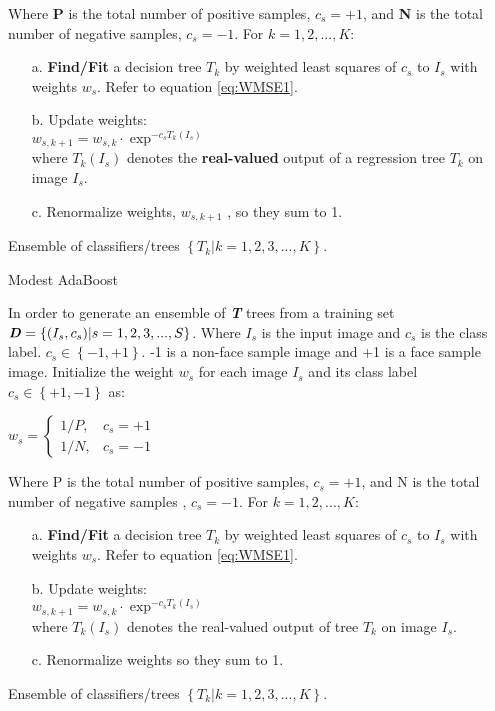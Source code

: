 \begin{compactitem}
\begin{algorithm}[htb]
\begin{algorithmic}[1]
		Where \textbf{P} is the total number of positive samples, $c_s=+1$, and \textbf{N} is the total number
		of negative samples, $c_s=-1$.
    \State For $k = 1,2,...,K:$
    \begin{itemize}
	\item[a.]{\textbf{Find/Fit} a decision tree $T_k$ by weighted least squares of $c_s$ to $I_s$ with
	weights $w_s$}. Refer to equation \eqref{eq:WMSE1}.
	\item[b.]{Update weights:}\\
		$w_{s,k+1} = w_{s,k} \cdot \exp^{-c_s T_k(I_s)}$\\
		where $T_k(I_s)$ denotes the \textbf{real-valued} output of a regression tree $T_k$ on image $I_s$.
	\item[c.]{Renormalize weights, $w_{s,k+1}$ , so they sum to 1.}
	\end{itemize}
    \Ensure
      Ensemble of classifiers/trees $\left\{ { T_k | k=1,2,3,...,K}\right\}$.
  \end{algorithmic}
\end{algorithm}

\begin{algorithm}[htb]
  \caption{ Modest AdaBoost}\cite{GML327}
  \label{alg:ModestAdaBoost}
  \begin{algorithmic}[1]
    \Require
	In order to generate an ensemble of \textbf{\textit{T}} trees from a training set
	$\textbf{\textit{D}}=\left\{ { (I_s,c_s) | s=1,2,3,...,S}\right\}$. Where $I_s$ is
	the input image and $c_s$ is the class label. $c_s \in \left\{{-1,+1 } \right\}$.
	-1 is a non-face sample image and +1 is a face sample image.
    \State Initialize the weight $w_s$ for each image $I_s$ and its class label $c_s \in
    	\left\{ {+1,-1}\right\}$ as:

    $w_s=
	\begin{cases}
    1/P,	& c_s = +1 \\
    1/N,    & c_s = -1
	\end{cases}$

		Where P is the total number of positive samples, $c_s=+1$,
		and N is the total number of negative samples , $c_s=-1$.
    \State For $k = 1,2,...,K:$
    \begin{itemize}
	\item[a.]{\textbf{Find/Fit} a decision tree $T_k$ by weighted least squares of $c_s$ to $I_s$ with
	weights $w_s$}. Refer to equation \eqref{eq:WMSE1}.
	\item[b.]{Update weights:}\\
		$w_{s,k+1} = w_{s,k} \cdot \exp^{-c_s T_k(I_s)}$\\
		where $T_k(I_s)$ denotes the real-valued output of tree $T_k$ on image $I_s$.
	\item[c.]{Renormalize weights so they sum to 1.}
	\end{itemize}
    \Ensure
      Ensemble of classifiers/trees $\left\{ { T_k | k=1,2,3,...,K}\right\}$.
  \end{algorithmic}
\end{algorithm}


\end{compactitem}
